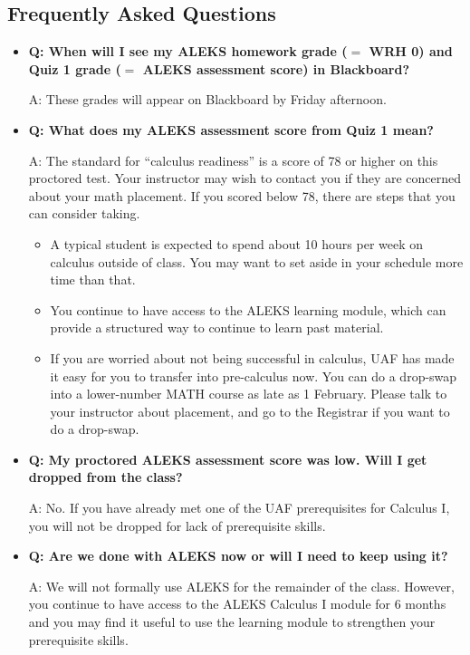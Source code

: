 \documentclass[12pt]{article}
\begin{document}
\subsection*{Frequently Asked Questions}
\begin{itemize}
\item \textbf{Q: When will I see my ALEKS homework grade ($=$ WRH 0) and Quiz 1 grade ($=$ ALEKS assessment score) in Blackboard?}

A: These grades will appear on Blackboard by Friday afternoon.

\item \textbf{Q: What does my ALEKS assessment score from Quiz 1 mean?}

A: The standard for ``calculus readiness'' is a score of 78 or higher on this proctored test.  Your instructor may wish to contact you if they are concerned about your math placement.  If you scored below 78, there are steps that you can consider taking.
    \begin{itemize}
    \item A typical student is expected to spend about 10 hours per week on calculus outside of class.  You may want to set aside in your schedule more time than that.
    \item You continue to have access to the ALEKS learning module, which can provide a structured way to continue to learn past material.
    \item If you are worried about not being successful in calculus, UAF has made it easy for you to transfer into pre-calculus now.  You can do a drop-swap into a lower-number MATH course as late as 1 February.  Please talk to your instructor about placement, and go to the Registrar if you want to do a drop-swap.
    \end{itemize}

\item \textbf{Q: My proctored ALEKS assessment score was low.  Will I get dropped from the class?}

A: No. If you have already met one of the UAF prerequisites for Calculus I, you will not be
dropped for lack of prerequisite skills.

\item \textbf{Q: Are we done with ALEKS now or will I need to keep using it?}

A: We will not formally use ALEKS for the remainder of the class. However, you continue to
have access to the ALEKS Calculus I module for 6 months and you may find it useful to use
the learning module to strengthen your prerequisite skills.
\end{itemize}
\end{document}
